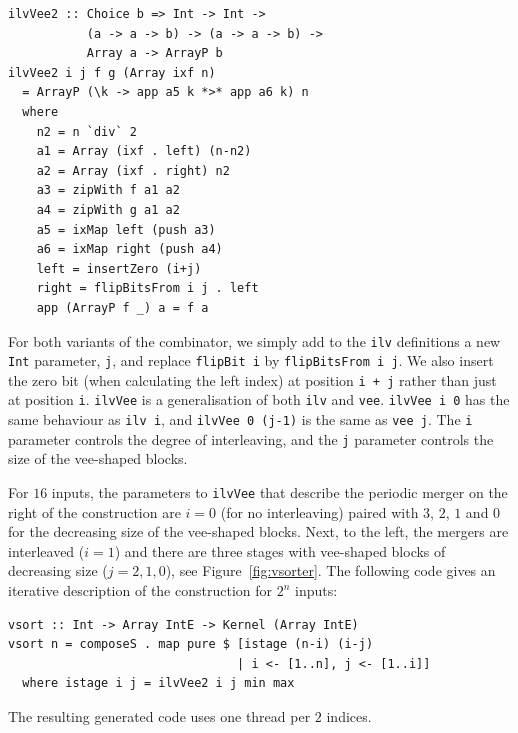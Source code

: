 \documentclass[]{sigplanconf}
\begin{document}
\begin{codesize}
\begin{verbatim}
ilvVee2 :: Choice b => Int -> Int -> 
           (a -> a -> b) -> (a -> a -> b) -> 
           Array a -> ArrayP b
ilvVee2 i j f g (Array ixf n) 
  = ArrayP (\k -> app a5 k *>* app a6 k) n
  where
    n2 = n `div` 2
    a1 = Array (ixf . left) (n-n2)
    a2 = Array (ixf . right) n2
    a3 = zipWith f a1 a2
    a4 = zipWith g a1 a2
    a5 = ixMap left (push a3)
    a6 = ixMap right (push a4)
    left = insertZero (i+j)
    right = flipBitsFrom i j . left
    app (ArrayP f _) a = f a
\end{verbatim}
\end{codesize}

For both variants of the combinator, we simply add to the {\tt ilv} definitions
a new {\tt Int} parameter, {\tt j}, and replace {\tt flipBit i} by {\tt flipBitsFrom i j}. We also insert the zero bit (when calculating the left index)
at position {\tt i + j} rather than just at position {\tt i}.
{\tt ilvVee} is a generalisation of both {\tt ilv} and {\tt vee}.
{\tt ilvVee i 0} has the same behaviour as {\tt ilv i}, and {\tt ilvVee 0 (j-1)}
is the same as {\tt vee j}. The {\tt i} parameter controls the degree
of interleaving, and the {\tt j} parameter controls the size of
the vee-shaped blocks.

For $16$ inputs, the parameters
to {\tt ilvVee} that describe the periodic merger on the right of the construction
are $i=0$ (for no interleaving) paired with $3$, $2$, $1$ and $0$
for the decreasing size of the vee-shaped blocks.
Next, to the left, the mergers are interleaved ($i=1$) and there are three
stages with
vee-shaped blocks of decreasing size ($j = 2, 1, 0$), see Figure~\ref{fig:vsorter}.
The following code gives an iterative description of the construction
for {\small $2^n$} inputs:


\begin{codesize}
\begin{verbatim}
vsort :: Int -> Array IntE -> Kernel (Array IntE)
vsort n = composeS . map pure $ [istage (n-i) (i-j) 
                                | i <- [1..n], j <- [1..i]]
  where istage i j = ilvVee2 i j min max
\end{verbatim}
\end{codesize}

\noindent
The resulting generated code uses one thread per
$2$ indices.
\end{document}
